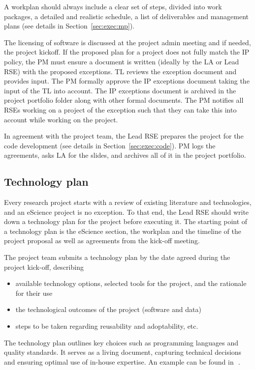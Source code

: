A workplan should always include a clear set of steps, divided into work packages, a detailed and realistic schedule, a
list of deliverables and management plans (see details in Section~\ref{sec:exec:mp}).

The licensing of software is discussed at the project admin meeting and if needed, the project kickoff. If the proposed plan for a project does not fully match the IP policy, the PM must ensure a document is written (ideally by the LA or Lead RSE) with the proposed exceptions. TL reviews the exception document and provides input. The PM formally approve the IP exceptions document taking the input of the TL into account. 
The IP exceptions document is archived in the project portfolio folder along with other formal documents. The PM notifies all RSEs working on a project of the exception such that they can take this into account while working on the project.

In agreement with the project team, the Lead RSE prepares the project for the code development (see details in Section~\ref{sec:exec:code}). PM logs the agreements, asks LA for the slides, and archives all of it in the project
portfolio.


\subsection{Technology plan}
\label{sec:init:techplan}

Every research project starts with a review of existing literature and technologies, and an eScience project is no exception.
To that end, the Lead RSE should write down a technology plan for the project before executing it. The starting point of 
a technology plan is the eScience section, the workplan and the timeline of the project proposal as well as agreements from the kick-off meeting.

The project team submits a technology plan by the date agreed during the project kick-off, describing
\begin{itemize}
\item available technology options, selected tools for the project, and the rationale for their use
\item the technological outcomes of the project (software and data) 
\item steps to be taken regarding reusability and adoptability, etc. 
\end{itemize}
The technology plan outlines key choices such as programming languages and quality standards. It serves as a living document, 
capturing technical decisions and ensuring optimal use of in-house expertise. An example can be found in ~\cite{spaaks2023asreview}.

